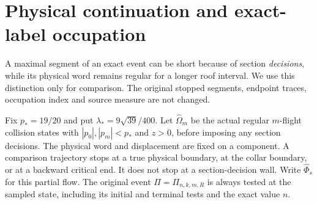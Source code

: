 \section{Physical continuation and exact-label occupation}
\label{sec:v96-continuation}
A maximal segment of an exact event can be short because of section
\emph{decisions}, while its physical word remains regular for a longer
roof interval. We use this distinction only for comparison. The original
stopped segments, endpoint traces, occupation index and source measure
are not changed.

Fix $p_*=19/20$ and put $\lambda_*=9\sqrt{39}/400$.
Let $\widehat\Omega_m$ be the actual regular $m$-flight collision
states with $|p_0|,|p_m|<p_*$ and $z>0$, before imposing any section
decisions. The physical word and displacement are fixed on a component.
A comparison trajectory stops at a true physical boundary, at the
collar boundary, or at a backward critical end. It does not stop at a
section-decision wall. Write $\widehat\Phi_s$ for this partial flow.
The original event $\Pi=\Pi_{n,k,m,R}$ is always tested at the sampled
state, including its initial and terminal tests and the exact value $n$.

